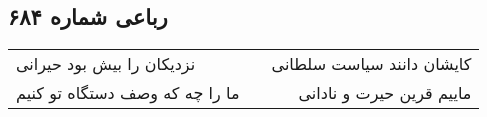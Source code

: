 \begin{center}
\section*{رباعی شماره ۶۸۴}
\label{sec:sh684}
\begin{longtable}{l p{0.5cm} r}
نزدیکان را بیش بود حیرانی
&&
کایشان دانند سیاست سلطانی
\\
ما را چه که وصف دستگاه تو کنیم
&&
ماییم قرین حیرت و نادانی
\\
\end{longtable}
\end{center}
